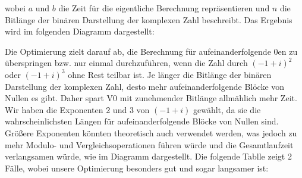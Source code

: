 \documentclass[course=erap]{aspdoc}
\begin{document}
    \noindent
    wobei $a$ und $b$ die Zeit für die eigentliche Berechnung repräsentieren und $n$ die Bitlänge der binären Darstellung der komplexen Zahl beschreibt. Das Ergebnis wird im folgenden Diagramm dargestellt:\\
    \begin{figure}[H]
\centering
{}
\end{figure}
\noindent
    Die Optimierung zielt darauf ab, die Berechnung für aufeinanderfolgende 0en zu überspringen bzw. nur einmal durchzuführen, wenn die Zahl durch $(-1+i)^2$ oder $(-1+i)^3$ ohne Rest teilbar ist. Je länger die Bitlänge der binären Darstellung der komplexen Zahl, desto mehr aufeinanderfolgende Blöcke von Nullen es gibt. Daher spart V0 mit zunehmender Bitlänge allmählich mehr Zeit. Wir haben die Exponenten 2 und 3 von $(-1+i)$ gewählt, da sie die wahrscheinlichsten Längen für aufeinanderfolgende Blöcke von Nullen sind. Größere Exponenten könnten theoretisch auch verwendet werden, was jedoch zu mehr Modulo- und Vergleichsoperationen führen würde und die Gesamtlaufzeit verlangsamen würde, wie im Diagramm dargestellt.
    Die folgende Tablle zeigt 2 F{\"a}lle, wobei unsere Optimierung besonders gut und sogar langsamer ist:
    
\end{document}
